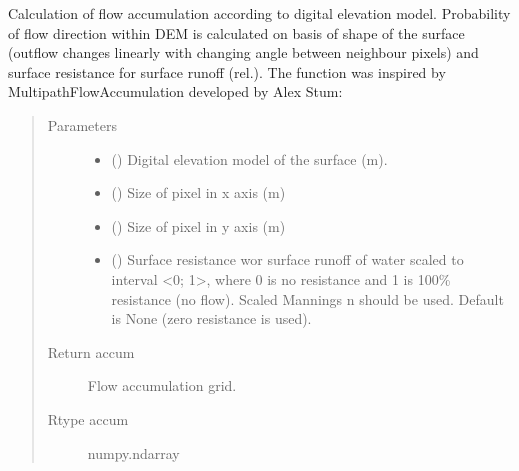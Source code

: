\documentclass[letterpaper,10pt,english]{sphinxmanual}
\begin{document}
\begin{fulllineitems}
\begin{fulllineitems}
\label{\detokenize{libs:waterflow.WaterBalance.waterFlows}}
Calculation of flow accumulation according to digital elevation model.
Probability of flow direction within DEM is calculated on basis 
of shape of the surface (outflow changes linearly with changing angle
between neighbour pixels) and surface resistance for surface runoff
(rel.).
The function was inspired by Multipath\sphinxhyphen{}Flow\sphinxhyphen{}Accumulation developed
by Alex Stum: 
\begin{quote}\begin{description}
\item[{Parameters}] \leavevmode\begin{itemize}
\item {} 
 () \textendash{} Digital elevation model of the surface (m).

\item {} 
 () \textendash{} Size of pixel in x axis (m)

\item {} 
 () \textendash{} Size of pixel in y axis (m)

\item {} 
 () \textendash{} Surface resistance wor surface runoff of water scaled
to interval \textless{}0; 1\textgreater{}, where 0 is no resistance
and 1 is 100\% resistance (no flow). Scaled Mannings n
should be used. Default is None (zero resistance is used).

\end{itemize}

\item[{Return accum}] \leavevmode
Flow accumulation grid.

\item[{Rtype accum}] \leavevmode
numpy.ndarray

\end{description}\end{quote}

\end{fulllineitems}


\end{fulllineitems}
\end{document}
